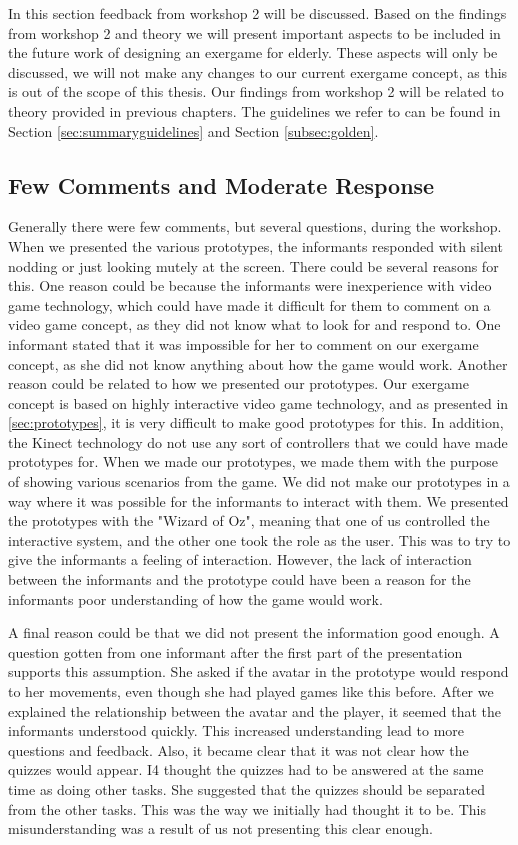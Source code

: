 In this section feedback from workshop 2 will be discussed. Based on the findings from workshop 2 and theory we will present important aspects to be included in the future work of designing an exergame for elderly. These aspects will only be discussed, we will not make any changes to our current exergame concept, as this is out of the scope of this thesis. Our findings from workshop 2 will be related to theory provided in previous chapters. The guidelines we refer to can be found in Section \ref{sec:summaryguidelines} and Section \ref{subsec:golden}.

\subsection{Few Comments and Moderate Response}
Generally there were few comments, but several questions, during the workshop. When we presented the various prototypes, the informants responded with silent nodding or just looking mutely at the screen. There could be several reasons for this. One reason could be because the informants were inexperience with video game technology, which could have made it difficult for them to comment on a video game concept, as they did not know what to look for and respond to. One informant stated that it was impossible for her to comment on our exergame concept, as she did not know anything about how the game would work. Another reason could be related to how we presented our prototypes. Our exergame concept is based on highly interactive video game technology, and as presented in \ref{sec:prototypes}, it is very difficult to make good prototypes for this. In addition, the Kinect technology do not use any sort of controllers that we could have made prototypes for. When we made our prototypes, we made them with the purpose of showing various scenarios from the game. We did not make our prototypes in a way where it was possible for the informants to interact with them. We presented the prototypes with the "Wizard of Oz", meaning that one of us controlled the interactive system, and the other one took the role as the user. This was to try to give the informants a feeling of interaction. However, the lack of interaction between the informants and the prototype could have been a reason for the informants poor understanding of how the game would work. 

A final reason could be that we did not present the information good enough. A question gotten from one informant after the first part of the presentation supports this assumption. She asked if the avatar in the prototype would respond to her movements, even though she had played games like this before. After we explained the relationship between the avatar and the player, it seemed that the informants understood quickly. This increased understanding lead to more questions and feedback. Also, it became clear that it was not clear how the quizzes would appear. I4 thought the quizzes had to be answered at the same time as doing other tasks. She suggested that the quizzes should be separated from the other tasks. This was the way we initially had thought it to be. This misunderstanding was a result of us not presenting this clear enough.

